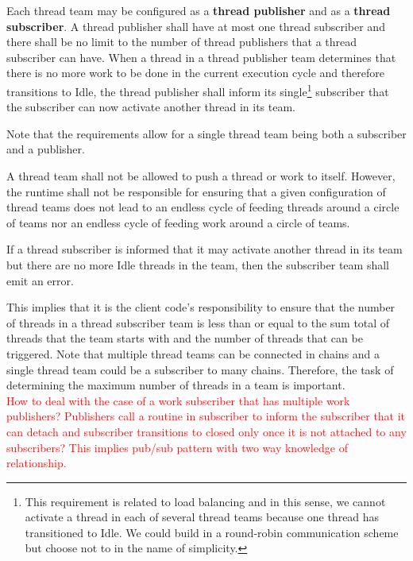 \documentclass{article}
\begin{document}
\begin{req}
Each thread team may be configured as a \textbf{thread publisher} and as a
\textbf{thread subscriber}.  A thread publisher shall have at most one thread
subscriber and there shall be no limit to the number of thread publishers that a
thread subscriber can have.  When a thread in a thread publisher team determines
that there is no more work to be done in the current execution cycle and
therefore transitions to Idle, the thread publisher shall inform its
single\footnote{This requirement is related to load balancing and in this sense,
we cannot activate a thread in each of several thread teams because one thread
has transitioned to Idle.  We could build in a round-robin communication
scheme but choose not to in the name of simplicity.} subscriber that the
subscriber can now activate another thread in its team.
\end{req}

Note that the requirements allow for a single thread team being both a
subscriber and a publisher.

\begin{req}
A thread team shall not be allowed to push a thread or work to itself.  However,
the runtime shall not be responsible for ensuring that a given configuration of
thread teams does not lead to an endless cycle of feeding threads around a
circle of teams nor an endless cycle of feeding work around a circle of teams.
\end{req}

\begin{req}
If a thread subscriber is informed that it may activate another thread in its
team but there are no more Idle threads in the team, then the
subscriber team shall emit an error.
\end{req}

This implies that it is the client code's responsibility to ensure that the
number of threads in a thread subscriber team is less than or equal to the sum
total of threads that the team starts with and the number of threads that can be
triggered.  Note that multiple thread teams can be connected in chains and a
single thread team could be a subscriber to many chains.  Therefore, the task of
determining the maximum number of threads in a team is important.\\

\textcolor{red}{How to deal with the case of a work subscriber that has
multiple work publishers?  Publishers call a routine in subscriber to inform the
subscriber that it can detach and subscriber transitions to closed only once it
is not attached to any subscribers?  This implies pub/sub pattern with two way
knowledge of relationship.}\\
\end{document}
